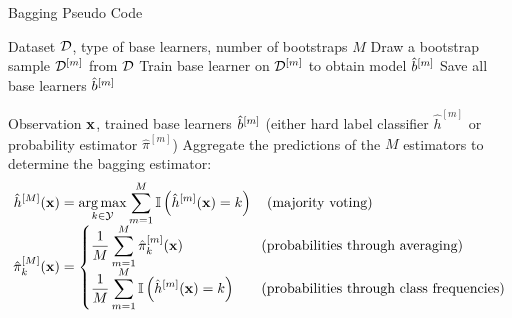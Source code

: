 \documentclass[11pt,compress,t,notes=noshow, xcolor=table]{beamer}
\begin{document}
\begin{vbframe}{Bagging Pseudo Code}
\vspace{-3ex}
\begin{algorithm}[H]
  \scriptsize
  \caption*{Bagging algorithm: Training}
  \begin{algorithmic}[1]
     Dataset $\mathcal{D}$, type of base learners, number of bootstraps $M$
      \State Draw a bootstrap sample $\mathcal{D}^{[m]}$ from $\mathcal{D}$
      \State Train base learner on $\mathcal{D}^{[m]}$ to obtain model $\hat{b}^{[m]}$
    \EndFor
    \State Save all base learners $\hat{b}^{[m]}$
  \end{algorithmic}
\end{algorithm}
\vspace{-2ex}
\begin{algorithm}[H]
  \scriptsize
  \caption*{Bagging algorithm: Prediction in case of classification}
  \begin{algorithmic}[1]
     Observation $\mathbf{x}$, trained base learners $\hat{b}^{[m]}$ (either hard label classifier $\hat{h}^{[m]}$ or probability estimator $\hat \pi^{[m]}$)
    \State Aggregate the predictions of the $M$ estimators to determine the bagging estimator:
    \vspace{-2ex}
    \begin{align*}
    \hat{h}^{[M]}(\mathbf{x}) &= \operatorname*{arg\,max}_{k \in \mathcal{Y}} \sum_{m=1}^M \mathbb{I}\left(\hat{h}^{[m]}(\mathbf{x}) = k\right) \quad \text{(majority voting)} \\[-1ex]
    \hat \pi_{k}^{[M]}(\mathbf{x}) &=
    \left\{
    \begin{aligned}
    &\frac{1}{M} \sum_{m=1}^M \hat \pi_{k}^{[m]}(\mathbf{x}) \quad && \text{(probabilities through averaging)} \\[-1ex]
    &\frac{1}{M} \sum_{m=1}^M \mathbb{I}\left(\hat{h}^{[m]}(\mathbf{x}) = k\right) \quad && \text{(probabilities through class frequencies)}
    \end{aligned}
    \right.
    \end{align*}
    \vspace{-3ex}
  \end{algorithmic}
\end{algorithm}
\vspace{-3ex}
\end{vbframe}
\end{document}
